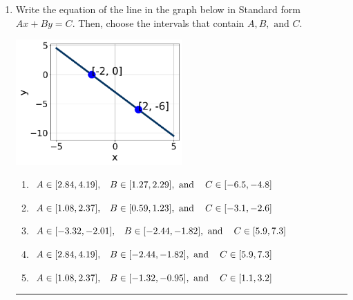 \documentclass[14pt]{extbook}
\newcommand{\litem}[1]{\item#1\hspace*{-1cm}\rule{\textwidth}{0.4pt}}
\begin{document}
\begin{enumerate}
{\begin{enumerate}[label=\Alph*.]
\end{enumerate} }
\litem{
Write the equation of the line in the graph below in Standard form $Ax+By=C$. Then, choose the intervals that contain $A, B, \text{ and } C$.
\begin{center}
    \includegraphics[width=0.5\textwidth]{../Figures/linearGraphToStandardB.png}
\end{center}
\begin{enumerate}[label=\Alph*.]
\item \( A \in [2.84, 4.19], \hspace{3mm} B \in [1.27, 2.29], \text{ and } \hspace{3mm} C \in [-6.5, -4.8] \)
\item \( A \in [1.08, 2.37], \hspace{3mm} B \in [0.59, 1.23], \text{ and } \hspace{3mm} C \in [-3.1, -2.6] \)
\item \( A \in [-3.32, -2.01], \hspace{3mm} B \in [-2.44, -1.82], \text{ and } \hspace{3mm} C \in [5.9, 7.3] \)
\item \( A \in [2.84, 4.19], \hspace{3mm} B \in [-2.44, -1.82], \text{ and } \hspace{3mm} C \in [5.9, 7.3] \)
\item \( A \in [1.08, 2.37], \hspace{3mm} B \in [-1.32, -0.95], \text{ and } \hspace{3mm} C \in [1.1, 3.2] \)

\end{enumerate} }
\end{enumerate}
\end{document}
